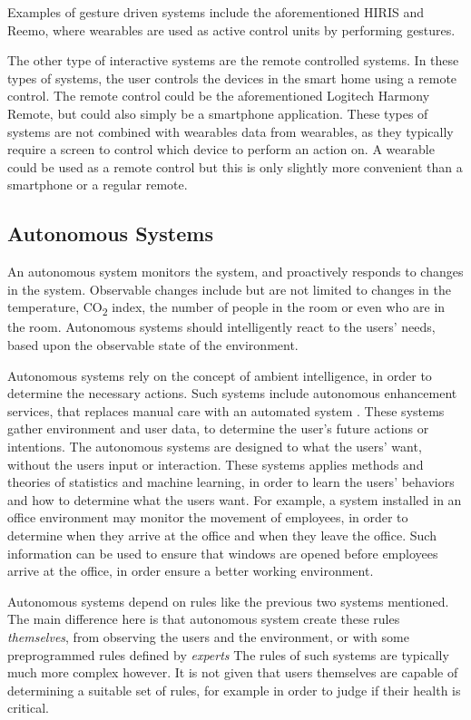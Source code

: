 Examples of gesture driven systems include the aforementioned HIRIS and Reemo, 
where wearables are used as active control units by performing gestures. 

The other type of interactive systems are the remote controlled systems. 
In these types of systems, the user controls the devices in the smart home using a remote control. 
The remote control could be the aforementioned Logitech Harmony Remote, 
but could also simply be a smartphone application. 
These types of systems are not combined with wearables data from wearables, 
as they typically require a screen to control which device to perform an action on.
A wearable could be used as a remote control but this is only slightly more convenient than a smartphone or a regular remote.

\subsection{Autonomous Systems}

An autonomous system monitors the system, 
and proactively responds to changes in the system. 
Observable changes include but are not limited to changes in the temperature, 
CO\textsubscript{2} index, the number of people in the room or even who are in the room.
Autonomous systems should intelligently react to the users' needs, 
based upon the observable state of the environment.

Autonomous systems rely on the concept of ambient intelligence, 
in order to determine the necessary actions.
Such systems include autonomous enhancement services, 
that replaces manual care with an automated system \cite{nehmer2006living}. 
These systems gather environment and user data, 
to determine the user's future actions or intentions. 
The autonomous systems are designed to what the users' want, 
without the users input or interaction. 
These systems applies methods and theories of statistics and machine learning, 
in order to learn the users' behaviors and how to determine what the users want. 
For example, a system installed in an office environment may monitor the movement of employees, 
in order to determine when they arrive at the office and when they leave the office. 
Such information can be used to ensure that windows are opened before employees arrive at the office, 
in order ensure a better working environment.

Autonomous systems depend on rules like the previous two systems mentioned. 
The main difference here is that autonomous system create these rules \emph{themselves}, 
from observing the users and the environment, 
or with some preprogrammed rules defined by \emph{experts}
The rules of such systems are typically much more complex however. 
It is not given that users themselves are capable of determining a suitable set of rules, 
for example in order to judge if their health is critical. 

